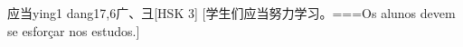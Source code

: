 \begin{EntryWithPhonetic}{应当}{ying1 dang1}{7,6}{⼴、⼹}[HSK 3]
  [学生们应当努力学习。===Os alunos devem se esforçar nos estudos.]
\end{EntryWithPhonetic}
